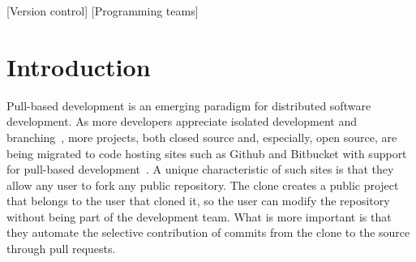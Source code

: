 \documentclass{acm_proc_article-sp}
\begin{document}
[Version control]
[Programming teams]



\section{Introduction}

%

Pull-based development is an emerging paradigm for distributed software
development. As more developers appreciate isolated
development and branching~\cite{Bird12}, more projects, both closed source and,
especially, open source, are being migrated to code hosting sites such as Github
and Bitbucket with support for pull-based development~\cite{Barr12}. A unique
characteristic of such sites is that they allow any user to fork any public
repository. The clone creates a public project that belongs to the user that
cloned it, so the user can modify the repository without being part of the
development team. What is more important is that they automate the selective
contribution of commits from the clone to the source through pull requests. 
\end{document}
